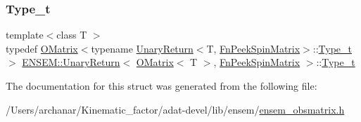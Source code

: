 \subsubsection{\texorpdfstring{Type\_t}{Type\_t}\hspace{0.1cm}{\footnotesize\ttfamily [3/3]}}
{\footnotesize\ttfamily template$<$class T $>$ \\
typedef \mbox{\hyperlink{classENSEM_1_1OMatrix}{O\+Matrix}}$<$typename \mbox{\hyperlink{structENSEM_1_1UnaryReturn}{Unary\+Return}}$<$T, \mbox{\hyperlink{structENSEM_1_1FnPeekSpinMatrix}{Fn\+Peek\+Spin\+Matrix}}$>$\+::\mbox{\hyperlink{structENSEM_1_1UnaryReturn_3_01OMatrix_3_01T_01_4_00_01FnPeekSpinMatrix_01_4_a9a23ee99cd498ef33180f667eae28655}{Type\+\_\+t}}$>$ \mbox{\hyperlink{structENSEM_1_1UnaryReturn}{E\+N\+S\+E\+M\+::\+Unary\+Return}}$<$ \mbox{\hyperlink{classENSEM_1_1OMatrix}{O\+Matrix}}$<$ T $>$, \mbox{\hyperlink{structENSEM_1_1FnPeekSpinMatrix}{Fn\+Peek\+Spin\+Matrix}} $>$\+::\mbox{\hyperlink{structENSEM_1_1UnaryReturn_3_01OMatrix_3_01T_01_4_00_01FnPeekSpinMatrix_01_4_a9a23ee99cd498ef33180f667eae28655}{Type\+\_\+t}}}



The documentation for this struct was generated from the following file\+:\begin{DoxyCompactItemize}
\item 
/\+Users/archanar/\+Kinematic\+\_\+factor/adat-\/devel/lib/ensem/\mbox{\hyperlink{adat-devel_2lib_2ensem_2ensem__obsmatrix_8h}{ensem\+\_\+obsmatrix.\+h}}\end{DoxyCompactItemize}
